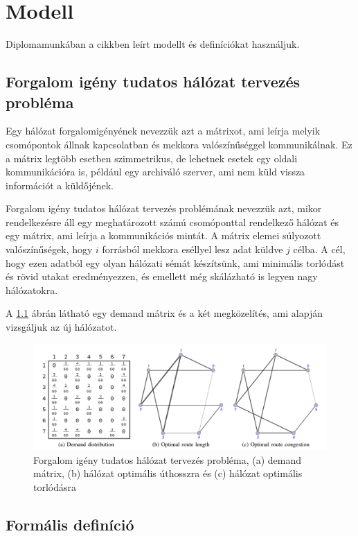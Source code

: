 \documentclass[12pt]{report}
\begin{document}
\chapter{Modell}


Diplomamunkában a \cite{avin_demand-aware_nodate} cikkben leírt modellt és definíciókat használjuk.

\section{Forgalom igény tudatos hálózat tervezés probléma}

Egy hálózat forgalomigényének nevezzük azt a mátrixot, ami leírja melyik csomópontok állnak kapcsolatban és mekkora valószínűséggel kommunikálnak.
Ez a mátrix legtöbb esetben szimmetrikus, de lehetnek esetek egy oldali kommunikációra is, például egy archiváló szerver, ami nem küld vissza információt a küldőjének.

Forgalom igény tudatos hálózat tervezés problémának nevezzük azt, mikor rendelkezésre áll egy meghatározott számú csomóponttal rendelkező hálózat és egy mátrix, ami leírja a kommunikációs mintát.
A mátrix elemei súlyozott valószínűségek, hogy $i$ forrásból mekkora eséllyel lesz adat küldve $j$ célba.
A cél, hogy ezen adatból egy olyan hálózati sémát készítsünk, ami minimális torlódást és rövid utakat eredményezzen, és emellett még skálázható is legyen nagy hálózatokra.

A \ref{network_types} ábrán látható egy demand mátrix és a két megközelítés, ami alapján vizsgáljuk az új hálózatot.

\begin{figure}[h]
	\centering
	\includegraphics[width=14cm]{pictures/example.png}
	\caption{Forgalom igény tudatos hálózat tervezés probléma, (a) demand mátrix, (b) hálózat optimális úthosszra és (c) hálózat optimális torlódásra \cite{avin_demand-aware_nodate}}
	\label{network_types}
\end{figure}

\section{Formális definíció}
\end{document}
